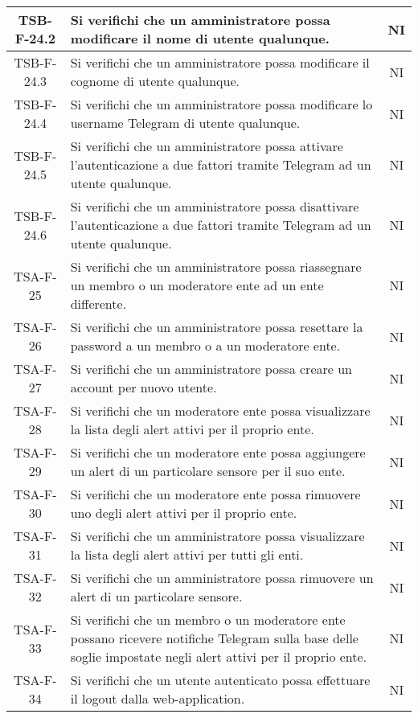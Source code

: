 \begin{center}
\begin{longtable}{|c|p{10cm}|c|}
			 \hline
			 TSB-F-24.2 & Si verifichi che un amministratore possa modificare il nome di utente qualunque. & NI \\
			 \hline
			 TSB-F-24.3 & Si verifichi che un amministratore possa modificare il cognome di utente qualunque. & NI \\
			 \hline
			 TSB-F-24.4 & Si verifichi che un amministratore possa modificare lo username Telegram di utente qualunque. & NI \\
			 \hline
			 TSB-F-24.5 & Si verifichi che un amministratore possa attivare l'autenticazione a due fattori tramite Telegram ad un utente qualunque. & NI \\
			 \hline
			 TSB-F-24.6 & Si verifichi che un amministratore possa disattivare l'autenticazione a due fattori tramite Telegram ad un utente qualunque. & NI \\
			 \hline
			 TSA-F-25 & Si verifichi che un amministratore possa riassegnare un membro o un moderatore ente ad un ente differente. & NI \\
			 \hline
			 TSA-F-26 & Si verifichi che un amministratore possa resettare la password a un membro o a un moderatore ente. & NI \\
			 \hline
			 TSA-F-27 & Si verifichi che un amministratore possa creare un account per nuovo utente. & NI \\
			 \hline
			 TSA-F-28 & Si verifichi che un moderatore ente possa visualizzare la lista degli alert attivi per il proprio ente. & NI \\
			 \hline
			 TSA-F-29 & Si verifichi che un moderatore ente possa aggiungere un alert di un particolare sensore per il suo ente. & NI \\
			 \hline
			 TSA-F-30 & Si verifichi che un moderatore ente possa rimuovere uno degli alert attivi per il proprio ente. & NI \\
			 \hline
			 TSA-F-31 & Si verifichi che un amministratore possa visualizzare la lista degli alert attivi per tutti gli enti. & NI \\
			 \hline
			 TSA-F-32 & Si verifichi che un amministratore possa rimuovere un alert di un particolare sensore. & NI \\
			 \hline
			 TSA-F-33 & Si verifichi che un membro o un moderatore ente possano ricevere notifiche Telegram sulla base delle soglie impostate negli alert attivi per il proprio ente. & NI \\
			 \hline
			 TSA-F-34 & Si verifichi che un utente autenticato possa effettuare il logout dalla web-application. & NI \\

\end{longtable}
\end{center}
